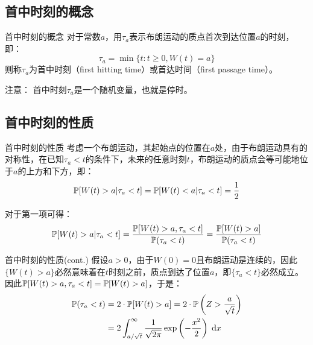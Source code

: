 \documentclass[t]{beamer}
\newcommand{\dif}{{\;\rm d}}
\renewcommand{\Pr}{\mathbb{P}}
\begin{document}
\subsection{首中时刻的概念}
\begin{frame}{首中时刻的概念}
  对于常数$a$，用$\tau_a$表示布朗运动的质点首次到达位置$a$的时刻，即：
	\begin{equation*}
	\tau_a=\min\{t: t\ge 0, W(t)=a\}
	\end{equation*}
  则称$\tau_a$为首中时刻（first hitting time）或首达时间（first passage time）。
  
\begin{block}{注意：}
  首中时刻$\tau_a$是一个随机变量，也就是停时。
\end{block}
\end{frame}



\subsection{首中时刻的性质}
\begin{frame}{首中时刻的性质}
  考虑一个布朗运动，其起始点的位置在$a$处，由于布朗运动具有的对称性，在已知$\tau_a<t$的条件下，未来的任意时刻$t$，布朗运动的质点会等可能地位于$a$的上方和下方，即：
  \begin{equation*}
  \Pr\qty[W(t)>a|\tau_a<t]=\Pr\qty[W(t)<a|\tau_a<t]=\frac{1}{2}
  \end{equation*}

  对于第一项可得：
\begin{equation*}
\Pr\qty[W(t)>a|\tau_a<t]=\frac{\Pr\qty[W(t)>a, \tau_a<t]}{\Pr(\tau_a<t)}=\frac{\Pr\qty[W(t)>a]}{\Pr(\tau_a<t)}
\end{equation*}
\end{frame}


\begin{frame}{首中时刻的性质(cont.)}
  假设$a>0$，由于$W(0)=0$且布朗运动是连续的，因此$\{W(t)>a\}$必然意味着在$t$时刻之前，质点到达了位置$a$，即$\{\tau_a<t\}$必然成立。因此$\Pr\qty[W(t)>a, \tau_a<t]=\Pr\qty[W(t)>a]$，于是：
  \begin{equation*}
  \begin{split}
  \Pr(\tau_a<t)&= 2\cdot \Pr\qty[W(t)>a]=2\cdot \Pr\left(Z>\frac{a}{\sqrt{t}}\right)\\
  &=2\int_{a/\sqrt{t}}^{\infty} \frac{1}{\sqrt{2\pi }}\exp\left(-\frac{x^2}{2}\right)\dif x\\
  \end{split}
  \end{equation*}
\end{frame}
\end{document}

